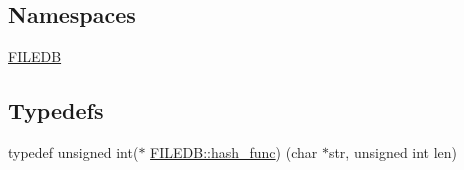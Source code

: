 \subsection*{Namespaces}
\begin{DoxyCompactItemize}
\item 
 \mbox{\hyperlink{namespaceFILEDB}{F\+I\+L\+E\+DB}}
\end{DoxyCompactItemize}
\subsection*{Typedefs}
\begin{DoxyCompactItemize}
\item 
typedef unsigned int($\ast$ \mbox{\hyperlink{namespaceFILEDB_a9e945e165dd500023ad29b4fcb2332b8}{F\+I\+L\+E\+D\+B\+::hash\+\_\+func}}) (char $\ast$str, unsigned int len)
\end{DoxyCompactItemize}
